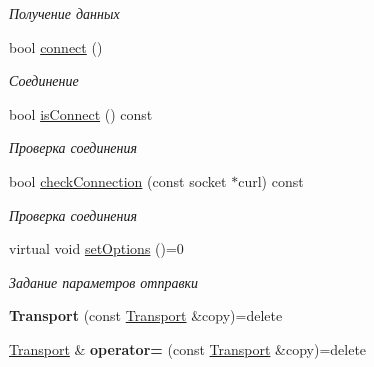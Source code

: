 \begin{DoxyCompactItemize}
\begin{DoxyCompactList}\small\item\em Получение данных \end{DoxyCompactList}\item 
bool \hyperlink{classJarvis_1_1connection_1_1Transport_abce3b6342c4a90603b187485422828c6}{connect} ()
\begin{DoxyCompactList}\small\item\em Соединение \end{DoxyCompactList}\item 
bool \hyperlink{classJarvis_1_1connection_1_1Transport_a9b15d1e6a7be779dcf8284ff0f17a8b0}{is\+Connect} () const
\begin{DoxyCompactList}\small\item\em Проверка соединения \end{DoxyCompactList}\item 
bool \hyperlink{classJarvis_1_1connection_1_1Transport_ae97760ea03453e9621027051c99a1c72}{check\+Connection} (const socket $\ast$curl) const
\begin{DoxyCompactList}\small\item\em Проверка соединения \end{DoxyCompactList}\item 
\mbox{\label{classJarvis_1_1connection_1_1Transport_aea38743d9d867274991c19f1747e6f11}} 
virtual void \hyperlink{classJarvis_1_1connection_1_1Transport_aea38743d9d867274991c19f1747e6f11}{set\+Options} ()=0
\begin{DoxyCompactList}\small\item\em Задание параметров отправки \end{DoxyCompactList}\item 
\mbox{\label{classJarvis_1_1connection_1_1Transport_ab65f3a824a24bd7d33fb8bf8b191d3ca}} 
{\bfseries Transport} (const \hyperlink{classJarvis_1_1connection_1_1Transport}{Transport} \&copy)=delete
\item 
\mbox{\label{classJarvis_1_1connection_1_1Transport_ae8dc60fe1e4b9cdd7730674ced147000}} 
\hyperlink{classJarvis_1_1connection_1_1Transport}{Transport} \& {\bfseries operator=} (const \hyperlink{classJarvis_1_1connection_1_1Transport}{Transport} \&copy)=delete
\end{DoxyCompactItemize}
